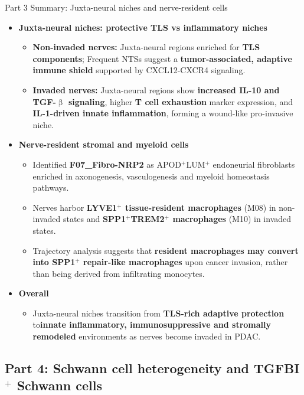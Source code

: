 \documentclass[10pt]{beamer}
\theoremstyle{plain}
\begin{document}
\begin{frame}{Part 3 Summary: Juxta-neural niches and nerve-resident cells}
  \begin{itemize}
    \item \textbf{Juxta-neural niches: protective TLS vs inflammatory niches}
      \begin{itemize}
        \item \textbf{Non-invaded nerves:} Juxta-neural regions enriched for \textbf{TLS components}; Frequent NTSs suggest a \textbf{tumor-associated, adaptive immune shield} supported by CXCL12-CXCR4 signaling.
        \item \textbf{Invaded nerves:} Juxta-neural regions show \textbf{increased IL-10 and TGF-\(\upbeta\) signaling}, higher \textbf{T cell exhaustion} marker expression, and \textbf{IL-1-driven innate inflammation}, forming a wound-like pro-invasive niche.
      \end{itemize}

    \item \textbf{Nerve-resident stromal and myeloid cells}
      \begin{itemize}
        \item Identified \textbf{F07\_Fibro-NRP2} as APOD\(^{+}\)LUM\(^{+}\) endoneurial fibroblasts enriched in axonogenesis, vasculogenesis and myeloid homeostasis pathways.
        \item Nerves harbor \textbf{LYVE1\(^{+}\) tissue-resident macrophages} (M08) in non-invaded states and \textbf{SPP1\(^{+}\)TREM2\(^{+}\) macrophages} (M10) in invaded states.
        \item Trajectory analysis suggests that \textbf{resident macrophages may convert into SPP1\(^{+}\) repair-like macrophages} upon cancer invasion, rather than being derived from infiltrating monocytes.
      \end{itemize}

    \item \textbf{Overall}
      \begin{itemize}
        \item Juxta-neural niches transition from \textbf{TLS-rich adaptive protection} to\textbf{innate inflammatory, immunosuppressive and stromally remodeled} environments as nerves become invaded in PDAC.
      \end{itemize}
  \end{itemize}
\end{frame}

\subsection{Part 4: Schwann cell heterogeneity and TGFBI\texorpdfstring{$^{+}$}{+} Schwann cells}
\end{document}
